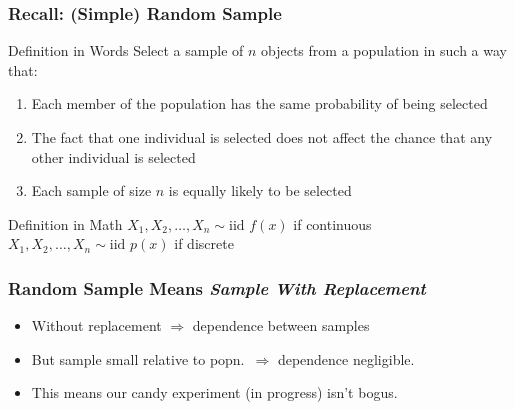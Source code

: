 \documentclass[handout]{beamer}
\begin{document}
\begin{frame}
\frametitle{Recall: (Simple) Random Sample}

\begin{block}{Definition in Words}
Select a sample of $n$ objects from a population in such a way that:
	\begin{enumerate}
\item Each member of the population has the same probability of being selected 
\item The fact that one individual is selected does not affect the chance that any other individual is selected
\item Each sample of size $n$ is equally likely to be selected

\end{enumerate}
\end{block}

\begin{alertblock}{Definition in Math}
	$X_1, X_2, \hdots, X_n \sim \mbox{iid } f(x)$ if continuous\\
  $X_1, X_2, \hdots, X_n \sim \mbox{iid } p(x)$ if discrete
\end{alertblock}

\end{frame}

\begin{frame}
  \frametitle{Random Sample Means \emph{Sample With Replacement}}


\begin{itemize}
  \item Without replacement $\Rightarrow$ dependence between samples
  \item But sample small relative to popn.\ $\Rightarrow$ dependence negligible.
  \item This means our candy experiment (in progress) isn't bogus.
\end{itemize}
\end{frame}
\end{document}
